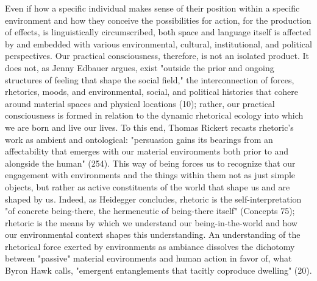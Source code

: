 \documentclass{article}
\begin{document}
Even if how a specific individual makes sense of their position within a specific environment and how they conceive the possibilities for action, for the production of effects, is linguistically circumscribed, both space and language itself is affected by and embedded with various environmental, cultural, institutional, and political perspectives. Our practical consciousness, therefore, is not an isolated product. It does not, as Jenny Edbauer argues, exist "outside the prior and ongoing structures of feeling that shape the social field," the interconnection of forces, rhetorics, moods, and environmental, social, and political histories that cohere around material spaces and physical locations (10); rather, our practical consciousness is formed in relation to the dynamic rhetorical ecology into which we are born and live our lives. To this end, Thomas Rickert recasts rhetoric's work as ambient and ontological: "persuasion gains its bearings from an affectability that emerges with our material environments both prior to and alongside the human" (254). This way of being forces us to recognize that our engagement with environments and the things within them not as just simple objects, but rather as active constituents of the world that shape us and are shaped by us. Indeed, as Heidegger concludes, rhetoric is the self-interpretation "of concrete being-there, the hermeneutic of being-there itself" (Concepts 75); rhetoric is the means by which we understand our being-in-the-world and how our environmental context shapes this understanding. An understanding of the rhetorical force exerted by environments as ambiance dissolves the dichotomy between "passive" material environments and human action in favor of, what Byron Hawk calls, "emergent entanglements that tacitly coproduce dwelling" (20).
\end{document}
